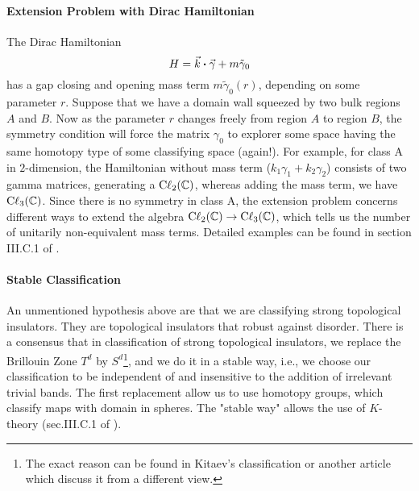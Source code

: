 \documentclass{article}
\begin{document}
\paragraph{Extension Problem with Dirac Hamiltonian}
The Dirac Hamiltonian
\begin{equation}
    H = \vec{k}\vdot \vec{\gamma} + m\tilde{\gamma}_0
\end{equation}
has a gap closing and opening mass term $m\tilde{\gamma}_0(r)$, depending on some
parameter $r$. Suppose that we have a domain wall squeezed by two bulk regions
$A$ and $B$. Now as the parameter $r$ changes freely from region $A$ to region
$B$, the symmetry condition will force the matrix $\gamma_0$ to explorer some
space having the same homotopy type of some classifying space (again!). For
example, for class $\mathrm{A}$ in $2$-dimension, the Hamiltonian without mass
term ($k_1\gamma_1 + k_2\gamma_2$) consists of two gamma matrices, generating a
$\mathrm{C\ell}_{2}(\mathbb{C})$, whereas adding the mass term, we have
$\mathrm{C\ell}_{3}(\mathbb{C})$. Since there is no symmetry in class $\mathrm{A}$, the
extension problem concerns different ways to extend the algebra
$\mathrm{C\ell}_{2}(\mathbb{C})\to \mathrm{C\ell}_{3}(\mathbb{C})$, which tells us the number of
unitarily non-equivalent mass terms. Detailed examples can be found in section
III.C.1 of \cite{Chiu2016}.

\paragraph{Stable Classification} An unmentioned hypothesis above are that we
are classifying strong topological insulators. They are topological insulators
that robust against disorder\cite{Fu2007}. There is a consensus that in
classification of strong topological insulators, we replace the Brillouin Zone
$T^d$ by $S^d$\footnote{The exact reason can be found in Kitaev's
    classification\cite{Kitaev2009a} or another article \cite{Kennedy2015} which
discuss it from a different view.}, and we do it in a stable way, i.e., we choose
our classification to be independent of and insensitive to the addition of
irrelevant trivial bands. The first replacement allow us to use homotopy groups,
which classify maps with domain in spheres. The "stable way" allows the use of
$K$-theory (sec.III.C.1 of \cite{Chiu2016}).
\end{document}
